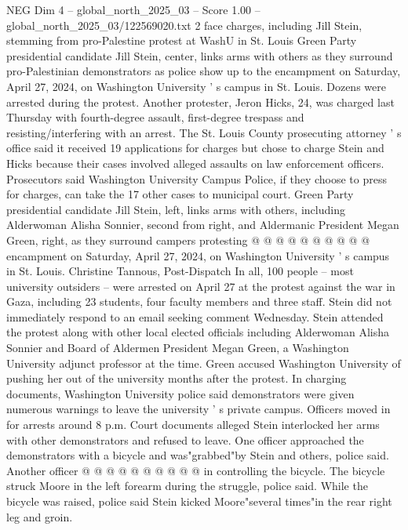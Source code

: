 \begin{textsample}{NEG Dim 4 – global\_north\_2025\_03 – Score 1.00 – global\_north\_2025\_03/122569020.txt}  \label{ex:f4_neg_396}
2 face charges, including Jill Stein, stemming from pro-Palestine protest at WashU in St.
Louis Green Party presidential candidate Jill Stein, center, links arms with others as they surround pro-Palestinian demonstrators as police show up to the encampment on Saturday, April 27, 2024, on Washington University ' s campus in St.
Louis.
Dozens were arrested during the protest.
Another protester, Jeron Hicks, 24, was charged last Thursday with fourth-degree assault, first-degree trespass and resisting/interfering with an arrest.
The St.
Louis County prosecuting attorney ' s office said it received 19 applications for charges but chose to charge Stein and Hicks because their cases involved alleged assaults on law enforcement officers.
Prosecutors said Washington University Campus Police, if they choose to press for charges, can take the 17 other cases to municipal court.
Green Party presidential candidate Jill Stein, left, links arms with others, including Alderwoman Alisha Sonnier, second from right, and Aldermanic President Megan Green, right, as they surround campers protesting @ @ @ @ @ @ @ @ @ @ encampment on Saturday, April 27, 2024, on Washington University ' s campus in St.
Louis.
Christine Tannous, Post-Dispatch In all, 100 people -- most university outsiders -- were arrested on April 27 at the protest against the war in Gaza, including 23 students, four faculty members and three staff.
Stein did not immediately respond to an email seeking comment Wednesday.
Stein attended the protest along with other local elected officials including Alderwoman Alisha Sonnier and Board of Aldermen President Megan Green, a Washington University adjunct professor at the time.
Green accused Washington University of pushing her out of the university months after the protest.
In charging documents, Washington University police said demonstrators were given numerous warnings to leave the university ' s private campus.
Officers moved in for arrests around 8 p.m.
Court documents alleged Stein interlocked her arms with other demonstrators and refused to leave.
One officer approached the demonstrators with a bicycle and was"grabbed"by Stein and others, police said.
Another officer @ @ @ @ @ @ @ @ @ @ in controlling the bicycle.
The bicycle struck Moore in the left forearm during the struggle, police said.
While the bicycle was raised, police said Stein kicked Moore"several times"in the rear right leg and groin.

\end{textsample}
